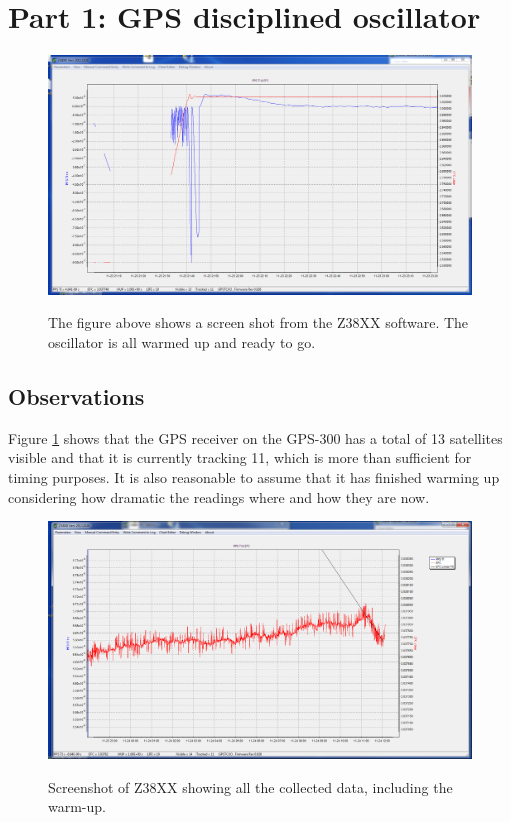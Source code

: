 \documentclass[11pt,english,a4paper]{article}
\begin{document}
\section{Part 1: GPS disciplined oscillator}
\begin{figure}[!htb]
  \centering
  \includegraphics[width=1\textwidth]{z38xx_EFC_oppstart.PNG} \label{fig:z38xx_oppstart}
  \caption[Z38XX screen shot] {The figure above shows a screen shot from the Z38XX software. The oscillator is all warmed up and ready to go.} 
\end{figure}

\subsection{Observations}
Figure \ref{fig:z38xx_oppstart} shows that the GPS receiver on the GPS-300 has a total of 13 satellites visible and that it is currently tracking 11, which is more than sufficient for timing purposes. It is also reasonable to assume that it has finished warming up considering how dramatic the readings where and how they are now. 

\begin{figure}[!htb]
  \centering
    \includegraphics[width=1\textwidth]{z38xx_EFC_oppvarmet_zoom.PNG}
    \label{fig:Z38XX_gpsdo12}
      \caption{Screenshot of Z38XX showing all the collected data, including the warm-up.}
\end{figure}
\end{document}
